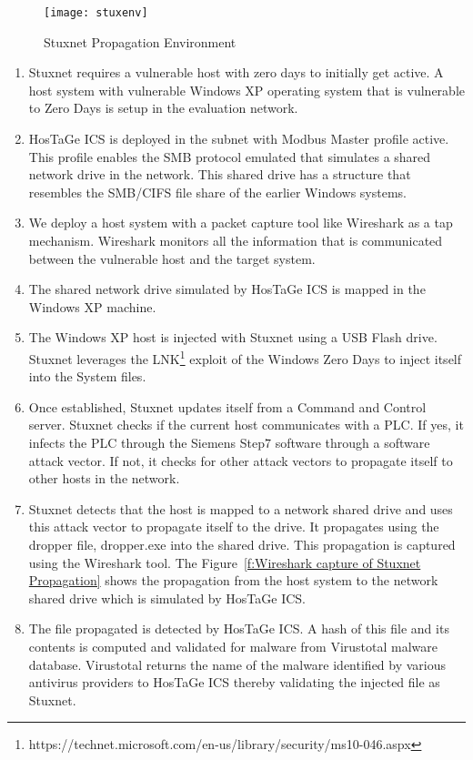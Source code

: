 \documentclass[article,msc=informatik,type=msc,colorback,accentcolor=tud9c]{tudthesis}
\begin{document}
	\begin{figure}
	\centering
	\texttt{[image: stuxenv]}
	\caption[Stuxnet Propagation Environment]{\label{f:Stuxnet Propagation Environment}Stuxnet Propagation Environment}
	\end{figure}
	
	
	\begin{enumerate}
	
	
	\item Stuxnet requires a vulnerable host with zero days to initially get active. A host system with vulnerable Windows XP operating system that is vulnerable to Zero Days is setup in the evaluation network.
	
	\item HosTaGe ICS is deployed in the subnet with Modbus Master profile active. This profile enables the \ac{SMB} protocol emulated that simulates a shared network drive in the network. This shared drive has a structure that resembles the SMB/CIFS file share of the earlier Windows systems. 
	
	\item We deploy a host system with a packet capture tool like Wireshark as a tap mechanism. Wireshark monitors all the information that is communicated between the vulnerable host and the target system.
	
	\item The shared network drive simulated by HosTaGe ICS is mapped in the Windows XP machine.
	
	\item The Windows XP host is injected with Stuxnet using a USB Flash drive. Stuxnet leverages the LNK\footnote{https://technet.microsoft.com/en-us/library/security/ms10-046.aspx} exploit of the Windows Zero Days to inject itself into the System files. 
	
	\item Once established, Stuxnet updates itself from a Command and Control server. Stuxnet checks if the current host communicates with a \ac{PLC}. If yes, it infects the \ac{PLC} through the Siemens Step7 software through a software attack vector. If not, it checks for other attack vectors to propagate itself to other hosts in the network.
	
	\item Stuxnet detects that the host is mapped to a network shared drive and uses this attack vector to propagate itself to the drive. It propagates using the dropper file, dropper.exe into the shared drive. This propagation is captured using the Wireshark tool. The Figure~\ref{f:Wireshark capture of Stuxnet Propagation} shows the propagation from the host system to the network shared drive which is simulated by HosTaGe ICS.
	
	\item The file propagated is detected by HosTaGe ICS. A hash of this file and its contents is computed and validated for malware from Virustotal malware database. Virustotal returns the name of the malware identified by various antivirus providers to HosTaGe ICS thereby validating the injected file as Stuxnet.
	
	\end{enumerate}
\end{document}
